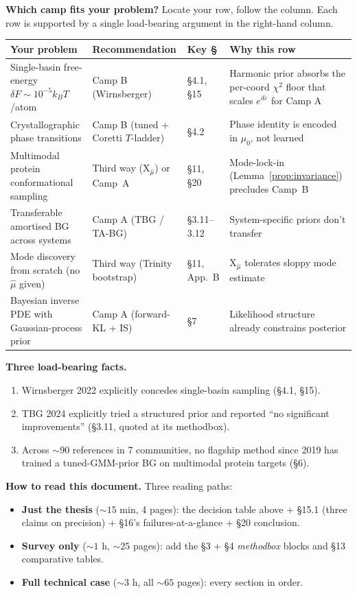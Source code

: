 \documentclass[11pt,letterpaper]{article}
\newcommand{\Xfun}{\mathrm{X}}
\theoremstyle{plain}
\begin{document}
\noindent\textbf{Which camp fits your problem?} Locate your row, follow the column. Each row is supported by a single load-bearing argument in the right-hand column.
\begin{center}
\small
\begin{tabular}{@{}p{4.0cm}p{2.8cm}lp{4.6cm}@{}}
\toprule
\textbf{Your problem} & \textbf{Recommendation} & \textbf{Key \S} & \textbf{Why this row} \\
\midrule
Single-basin free-energy $\delta F\!\sim\!10^{-5}k_BT$/atom & Camp B (Wirnsberger) & \S4.1, \S15 & Harmonic prior absorbs the per-coord $\chi^2$ floor that scales $e^{d\varepsilon}$ for Camp A \\
Crystallographic phase transitions & Camp B (tuned + Coretti $T$-ladder) & \S4.2 & Phase identity is encoded in $\mu_0$, not learned \\
Multimodal protein conformational sampling & Third way ($\Xfun_{\hat\mu}$) or Camp~A & \S11, \S20 & Mode-lock-in (Lemma~\ref{prop:invariance}) precludes Camp~B \\
Transferable amortised BG across systems & Camp A (TBG / TA-BG) & \S3.11--3.12 & System-specific priors don't transfer \\
Mode discovery from scratch (no $\hat\mu$ given) & Third way (Trinity bootstrap) & \S11, App.~B & $\Xfun_{\hat\mu}$ tolerates sloppy mode estimate \\
Bayesian inverse PDE with Gaussian-process prior & Camp A (forward-KL + IS) & \S7 & Likelihood structure already constrains posterior \\
\bottomrule
\end{tabular}
\end{center}

\bigskip

\noindent\textbf{Three load-bearing facts.}
\begin{enumerate}\setlength{\itemsep}{0pt}
  \item Wirnsberger 2022 explicitly concedes single-basin sampling (\S4.1, \S15).
  \item TBG 2024 explicitly tried a structured prior and reported ``no significant
    improvements'' (\S3.11, quoted at its methodbox).
  \item Across ${\sim}90$ references in 7 communities, no flagship method since 2019
    has trained a tuned-GMM-prior BG on multimodal protein targets (\S6).
\end{enumerate}

\bigskip

\noindent\textbf{How to read this document.} Three reading paths:
\begin{itemize}\setlength{\itemsep}{1pt}
  \item \textbf{Just the thesis} (${\sim}15$ min, 4 pages): the decision table above + \S15.1 (three claims on precision) + \S16's failures-at-a-glance + \S20 conclusion.
  \item \textbf{Survey only} (${\sim}1$ h, ${\sim}25$ pages): add the \S3 + \S4 \emph{methodbox} blocks and \S13 comparative tables.
  \item \textbf{Full technical case} (${\sim}3$ h, all ${\sim}65$ pages): every section in order.
\end{itemize}
\end{document}
